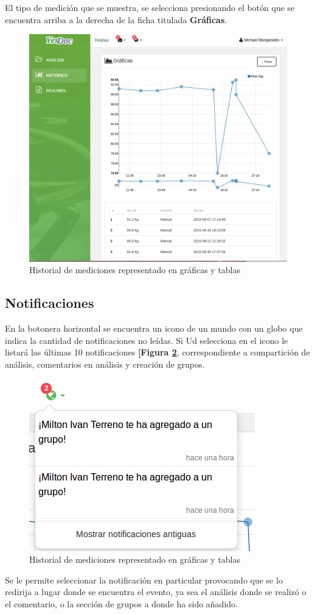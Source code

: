 \documentclass[a4paper,12pt]{article}
\begin{document}
El tipo de medición que se muestra, se selecciona presionando el botón que se encuentra arriba a la derecha de la ficha titulada \textbf{Gráficas}.

\begin{figure}
	\centering
	\includegraphics[width=.8\textwidth]{img/manual_de_usuario/historico}
	\caption{Historial de mediciones representado en gráficas y tablas}
	\label{mu-historico}
\end{figure}

\subsection{Notificaciones}
En la botonera horizontal se encuentra un icono de un mundo con un globo que indica la cantidad de notificaciones no leídas. Si Ud selecciona en el icono le listará las últimas 10 notificaciones \textbf{[Figura \ref{mu-notificaciones_vista_previa}}, correspondiente a compartición de análisis, comentarios en análisis y creación de grupos. 
\begin{figure}
	\centering
	\includegraphics[width=.8\textwidth]{img/manual_de_usuario/notificaciones_vista_previa}
	\caption{Historial de mediciones representado en gráficas y tablas}
	\label{mu-notificaciones_vista_previa}
\end{figure}
Se le permite seleccionar la notificación en particular provocando que se lo redirija a lugar donde se encuentra el evento, ya sea el análisis donde se realizó o el comentario, o la sección de grupos a donde ha sido añadido.
\end{document}
